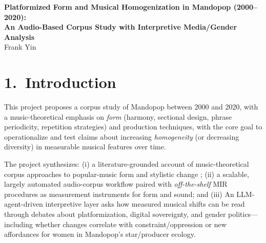 \documentclass[11pt]{article}
\newcommand{\CandidateName}{Frank Yin} %
\newcommand{\DegreeProgram}{PhD Proposal (Music Theory)} %
\newcommand{\ProposalDate}{\today} %
\begin{document}
\begin{center}
{\Large \textbf{Platformized Form and Musical Homogenization in Mandopop (2000--2020):}\\
\textbf{An Audio-Based Corpus Study with Interpretive Media/Gender Analysis}}\\[0.6em]
\CandidateName 

\end{center}

\vspace{-0.25em}
\section*{1.\ Introduction}
This project proposes a corpus study of Mandopop between 2000 and 2020, with a music-theoretical emphasis on \emph{form} (harmony, sectional design, phrase periodicity, repetition strategies) and production techniques, with the core goal to operationalize and test claims about increasing \emph{homogeneity} (or decreasing diversity) in measurable musical features over time.



The project synthesizes: (i) a literature-grounded account of music-theoretical corpus approaches to popular-music form and stylistic change \citep{serra2012,mauch2015,leveillegauvin2015,duinker2020,shea2020diss,shea2022sampling,shea2024diversity}; (ii) a scalable, largely automated audio-corpus workflow paired with \emph{off-the-shelf} MIR procedures as measurement instruments for form and sound; and (iii) An LLM-agent-driven interpretive layer asks how measured musical shifts can be read through debates about platformization, digital sovereignty, and gender politics---including whether changes correlate with constraint/oppression or new affordances for women in Mandopop’s star/producer ecology.
\end{document}

